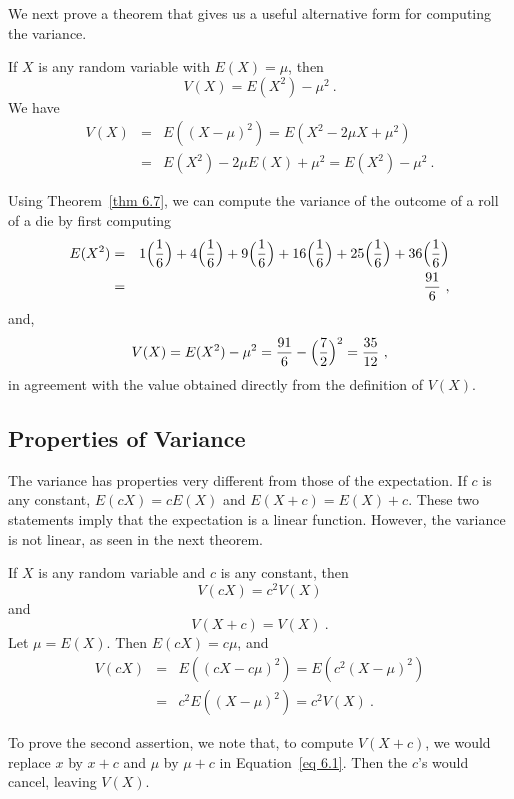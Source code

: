 We next prove a theorem that gives us a useful alternative form for computing the
variance.

\begin{theorem}\label{thm 6.7} If $X$ is any random variable with $E(X) = \mu$, then
$$ V(X) = E(X^2) - \mu^2\ .
$$
\proof We have
\begin{eqnarray*} V(X) & = & E((X - \mu)^2) = E(X^2 - 2\mu X + \mu^2) \\
     & = & E(X^2) - 2\mu E(X) + \mu^2 = E(X^2) - \mu^2\ .
\end{eqnarray*}
\end{theorem}

Using Theorem~\ref{thm 6.7}, we can compute the variance of the outcome of a roll of
a die by first computing
\begin{eqnarray*} E(X^2) & = & 1\Bigl(\frac 16\Bigr) + 4\Bigl(\frac 16\Bigr) +
9\Bigl(\frac 16\Bigr) + 16\Bigl(\frac 16\Bigr) + 25\Bigl(\frac 16\Bigr) +
36\Bigl(\frac 16\Bigr) \\
       & = &\frac {91}6\ ,
\end{eqnarray*} and,
$$ 
V(X)  =  E(X^2) - \mu^2 = \frac {91}{6} - \Bigl(\frac 72\Bigr)^2
 = \frac {35}{12}\ ,
$$
in agreement with the value obtained directly from the definition of
$V(X)$.


\subsection*{Properties of Variance}

The variance has properties very different from those of the expectation.  If
$c$ is any constant, $E(cX) = cE(X)$ and $E(X + c) = E(X) + c$.  These two statements
imply that the expectation is a linear function.  However, the variance is not
linear, as seen in the next theorem.

\begin{theorem}\label{thm 6.6} If $X$ is any random variable and $c$ is any constant,
then
$$ V(cX)  = c^2 V(X)
$$ and
$$ V(X + c) = V(X)\ .
$$
\proof Let $\mu = E(X)$.  Then $E(cX) = c\mu$, and
\begin{eqnarray*} V(cX) &=& E((cX - c\mu)^2) = E(c^2(X - \mu)^2) \\
      &=& c^2 E((X - \mu)^2) = c^2 V(X)\ .
\end{eqnarray*}

To prove the second assertion, we note that, to compute $V(X + c)$, we would replace
$x$ by $x + c$ and $\mu$ by $\mu + c$ in Equation~\ref{eq 6.1}. Then the
$c$'s would cancel, leaving $V(X)$.
\end{theorem}

